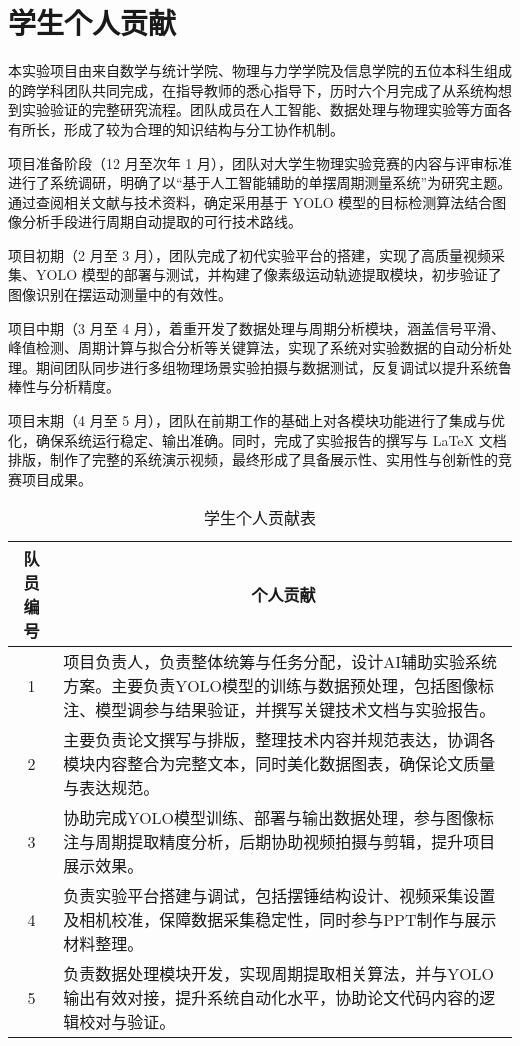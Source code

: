 \section{学生个人贡献}
本实验项目由来自数学与统计学院、物理与力学学院及信息学院的五位本科生组成的跨学科团队共同完成，在指导教师的悉心指导下，历时六个月完成了从系统构想到实验验证的完整研究流程。团队成员在人工智能、数据处理与物理实验等方面各有所长，形成了较为合理的知识结构与分工协作机制。

项目准备阶段（12 月至次年 1 月），团队对大学生物理实验竞赛的内容与评审标准进行了系统调研，明确了以“基于人工智能辅助的单摆周期测量系统”为研究主题。通过查阅相关文献与技术资料，确定采用基于 YOLO 模型的目标检测算法结合图像分析手段进行周期自动提取的可行技术路线。

项目初期（2 月至 3 月），团队完成了初代实验平台的搭建，实现了高质量视频采集、YOLO 模型的部署与测试，并构建了像素级运动轨迹提取模块，初步验证了图像识别在摆运动测量中的有效性。

项目中期（3 月至 4 月），着重开发了数据处理与周期分析模块，涵盖信号平滑、峰值检测、周期计算与拟合分析等关键算法，实现了系统对实验数据的自动分析处理。期间团队同步进行多组物理场景实验拍摄与数据测试，反复调试以提升系统鲁棒性与分析精度。

项目末期（4 月至 5 月），团队在前期工作的基础上对各模块功能进行了集成与优化，确保系统运行稳定、输出准确。同时，完成了实验报告的撰写与 LaTeX 文档排版，制作了完整的系统演示视频，最终形成了具备展示性、实用性与创新性的竞赛项目成果。

\begin{table}[H]
\centering
\caption{学生个人贡献表}
\begin{tabular}{@{}c p{12.5cm}@{}}
\toprule
\textbf{队员编号} & \multicolumn{1}{c}{\textbf{个人贡献}} \\
\midrule
1 & 项目负责人，负责整体统筹与任务分配，设计AI辅助实验系统方案。主要负责YOLO模型的训练与数据预处理，包括图像标注、模型调参与结果验证，并撰写关键技术文档与实验报告。 \\
2 & 主要负责论文撰写与排版，整理技术内容并规范表达，协调各模块内容整合为完整文本，同时美化数据图表，确保论文质量与表达规范。 \\
3 & 协助完成YOLO模型训练、部署与输出数据处理，参与图像标注与周期提取精度分析，后期协助视频拍摄与剪辑，提升项目展示效果。 \\
4 & 负责实验平台搭建与调试，包括摆锤结构设计、视频采集设置及相机校准，保障数据采集稳定性，同时参与PPT制作与展示材料整理。 \\
5 & 负责数据处理模块开发，实现周期提取相关算法，并与YOLO输出有效对接，提升系统自动化水平，协助论文代码内容的逻辑校对与验证。 \\
\bottomrule
\end{tabular}
\label{tab:contribution}
\end{table}